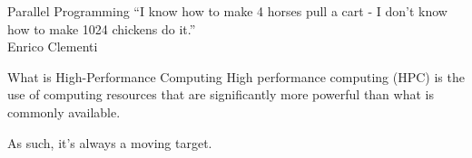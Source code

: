 

\begin{frame}{Parallel Programming}
\centering
``I know how to make 4 horses pull a cart - I don't know how to make 1024
chickens do it.''\\Enrico Clementi
\end{frame}

\begin{frame}{What is High-Performance Computing}
\centering
High performance computing (HPC) is the use of computing resources that are
significantly more powerful than what is commonly available.

As such, it's always a moving target.
\end{frame}

